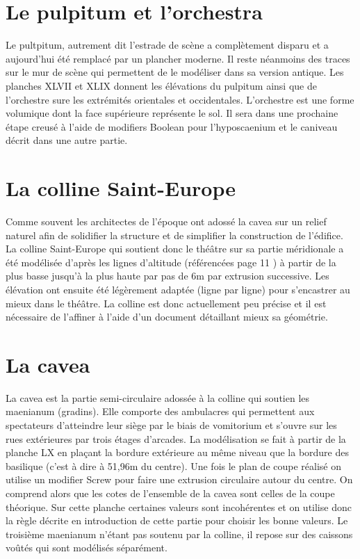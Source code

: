 		\section{Le pulpitum et l'orchestra} 

Le pultpitum, autrement dit l'estrade de scène a complètement disparu et a aujourd'hui été remplacé par un plancher moderne. Il reste néanmoins des traces sur le mur de scène qui permettent de le modéliser dans sa version antique. Les planches XLVII et XLIX \cite{ref2} donnent les élévations du pulpitum ainsi que de l'orchestre sure les extrémités orientales et occidentales. L'orchestre est une forme volumique dont la face supérieure représente le sol. Il sera dans une prochaine étape creusé à l'aide de modifiers Boolean pour l'hyposcaenium et le caniveau décrit dans une autre partie.

		\section{La colline Saint-Europe} 
Comme souvent les architectes de l'époque ont adossé la cavea sur un relief naturel afin de solidifier la structure et de simplifier la construction de l'édifice. La colline Saint-Europe qui soutient donc le théâtre sur sa partie méridionale a été modélisée d'après les lignes d'altitude (référencées page 11 \cite{ref}) à partir de la plus basse jusqu'à la plus haute par pas de 6m par extrusion successive. Les élévation ont ensuite été légèrement adaptée (ligne par ligne) pour s'encastrer au mieux dans le théâtre. La colline est donc actuellement peu précise et il est nécessaire de l'affiner à l'aide d'un document détaillant mieux sa géométrie.

		\section{La cavea} 

La cavea est la partie semi-circulaire adossée à la colline qui soutien les maenianum (gradins). Elle comporte des ambulacres qui permettent aux spectateurs d'atteindre leur siège par le biais de vomitorium et s'ouvre sur les rues extérieures par trois étages d'arcades. La modélisation se fait à partir de la planche LX \cite{ref2} en plaçant la bordure extérieure au même niveau que la bordure des basilique (c'est à dire à 51,96m du centre). Une fois le plan de coupe réalisé on utilise un modifier Screw pour faire une extrusion circulaire autour du centre. On comprend alors que les cotes de l'ensemble de la cavea sont celles de la coupe théorique. Sur cette planche certaines valeurs sont incohérentes et on utilise donc la règle décrite en introduction de cette partie pour choisir les bonne valeurs.
Le troisième maenianum n'étant pas soutenu par la colline, il repose sur des caissons voûtés qui sont modélisés séparément. 

